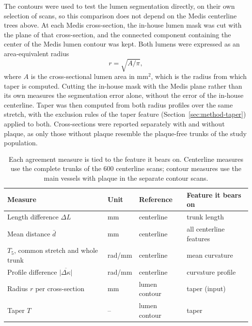 The contours were used to test the lumen segmentation directly, on their own selection of scans, so this comparison does not depend on the Medis centerline trees above.
At each Medis cross-section, the in-house lumen mask was cut with the plane of that cross-section, and the connected component containing the center of the Medis lumen contour was kept.
Both lumens were expressed as an area-equivalent radius
\begin{equation}
  r = \sqrt{A/\pi} ,
  \label{eq:method-medis-radius}
\end{equation}
where $A$ is the cross-sectional lumen area in mm$^2$, which is the radius from which taper is computed.
Cutting the in-house mask with the Medis plane rather than its own measures the segmentation error alone, without the error of the in-house centerline.
Taper was then computed from both radius profiles over the same stretch, with the exclusion rules of the taper feature (Section~\ref{sec:method-taper}) applied to both.
Cross-sections were reported separately with and without plaque, as only those without plaque resemble the plaque-free trunks of the study population.

\begin{table}[htbp]
  \centering
  \caption{Each agreement measure is tied to the feature it bears on. Centerline measures use the complete trunks of the 600 centerline scans; contour measures use the main vessels with plaque in the separate contour scans.}
  \label{tab:method-medis-metrics}
  \begin{tabular}{llll}
    \toprule
    Measure & Unit & Reference & Feature it bears on \\
    \midrule
    Length difference $\Delta L$ & mm & centerline & trunk length \\
    Mean distance $\bar{d}$ & mm & centerline & all centerline features \\
    $T_5$, common stretch and whole trunk & rad/mm & centerline & mean curvature \\
    Profile difference $\overline{|\Delta\kappa|}$ & rad/mm & centerline & curvature profile \\
    Radius $r$ per cross-section & mm & lumen contour & taper (input) \\
    Taper $T$ & -- & lumen contour & taper \\
    \bottomrule
  \end{tabular}
\end{table}

